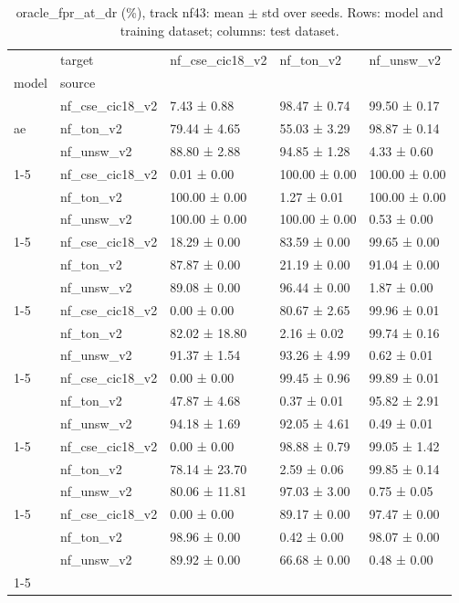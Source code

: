 \begin{table}
\caption{oracle_fpr_at_dr (\%), track nf43: mean $\pm$ std over seeds. Rows: model and training dataset; columns: test dataset.}
\label{tab:matrix_nf43_oracle_fpr_at_dr}
\begin{tabular}{lllll}
\toprule
 & target & nf_cse_cic18_v2 & nf_ton_v2 & nf_unsw_v2 \\
model & source &  &  &  \\
\midrule
\multirow[t]{3}{*}{ae} & nf_cse_cic18_v2 & 7.43 ± 0.88 & 98.47 ± 0.74 & 99.50 ± 0.17 \\
 & nf_ton_v2 & 79.44 ± 4.65 & 55.03 ± 3.29 & 98.87 ± 0.14 \\
 & nf_unsw_v2 & 88.80 ± 2.88 & 94.85 ± 1.28 & 4.33 ± 0.60 \\
\cline{1-5}
\multirow[t]{3}{*}{dt} & nf_cse_cic18_v2 & 0.01 ± 0.00 & 100.00 ± 0.00 & 100.00 ± 0.00 \\
 & nf_ton_v2 & 100.00 ± 0.00 & 1.27 ± 0.01 & 100.00 ± 0.00 \\
 & nf_unsw_v2 & 100.00 ± 0.00 & 100.00 ± 0.00 & 0.53 ± 0.00 \\
\cline{1-5}
\multirow[t]{3}{*}{lda} & nf_cse_cic18_v2 & 18.29 ± 0.00 & 83.59 ± 0.00 & 99.65 ± 0.00 \\
 & nf_ton_v2 & 87.87 ± 0.00 & 21.19 ± 0.00 & 91.04 ± 0.00 \\
 & nf_unsw_v2 & 89.08 ± 0.00 & 96.44 ± 0.00 & 1.87 ± 0.00 \\
\cline{1-5}
\multirow[t]{3}{*}{mlp} & nf_cse_cic18_v2 & 0.00 ± 0.00 & 80.67 ± 2.65 & 99.96 ± 0.01 \\
 & nf_ton_v2 & 82.02 ± 18.80 & 2.16 ± 0.02 & 99.74 ± 0.16 \\
 & nf_unsw_v2 & 91.37 ± 1.54 & 93.26 ± 4.99 & 0.62 ± 0.01 \\
\cline{1-5}
\multirow[t]{3}{*}{rf} & nf_cse_cic18_v2 & 0.00 ± 0.00 & 99.45 ± 0.96 & 99.89 ± 0.01 \\
 & nf_ton_v2 & 47.87 ± 4.68 & 0.37 ± 0.01 & 95.82 ± 2.91 \\
 & nf_unsw_v2 & 94.18 ± 1.69 & 92.05 ± 4.61 & 0.49 ± 0.01 \\
\cline{1-5}
\multirow[t]{3}{*}{tabnet} & nf_cse_cic18_v2 & 0.00 ± 0.00 & 98.88 ± 0.79 & 99.05 ± 1.42 \\
 & nf_ton_v2 & 78.14 ± 23.70 & 2.59 ± 0.06 & 99.85 ± 0.14 \\
 & nf_unsw_v2 & 80.06 ± 11.81 & 97.03 ± 3.00 & 0.75 ± 0.05 \\
\cline{1-5}
\multirow[t]{3}{*}{xgb} & nf_cse_cic18_v2 & 0.00 ± 0.00 & 89.17 ± 0.00 & 97.47 ± 0.00 \\
 & nf_ton_v2 & 98.96 ± 0.00 & 0.42 ± 0.00 & 98.07 ± 0.00 \\
 & nf_unsw_v2 & 89.92 ± 0.00 & 66.68 ± 0.00 & 0.48 ± 0.00 \\
\cline{1-5}
\bottomrule
\end{tabular}
\end{table}
